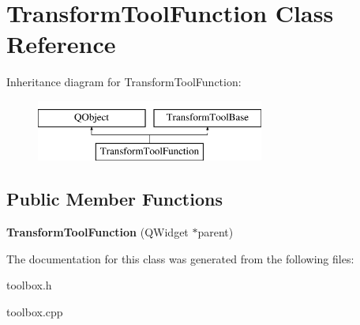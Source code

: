 \hypertarget{class_transform_tool_function}{\section{Transform\-Tool\-Function Class Reference}
\label{class_transform_tool_function}
}
Inheritance diagram for Transform\-Tool\-Function\-:\begin{figure}[H]
\begin{center}
\leavevmode
\includegraphics[height=2.000000cm]{class_transform_tool_function}
\end{center}
\end{figure}
\subsection*{Public Member Functions}
\begin{DoxyCompactItemize}
\item 
\hypertarget{class_transform_tool_function_a03cfa9a4e1da1303959f9da434de0ab5}{{\bfseries Transform\-Tool\-Function} (Q\-Widget $\ast$parent)}\label{class_transform_tool_function_a03cfa9a4e1da1303959f9da434de0ab5}

\end{DoxyCompactItemize}


The documentation for this class was generated from the following files\-:\begin{DoxyCompactItemize}
\item 
toolbox.\-h\item 
toolbox.\-cpp\end{DoxyCompactItemize}
